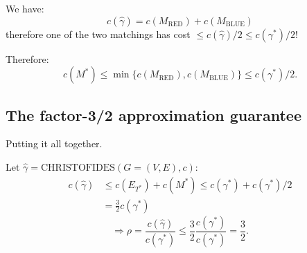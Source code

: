 We have:
\[c(\widehat\gamma)=c(M_{\mathrm{RED}})+c(M_{\mathrm{BLUE}})\]
therefore one of the two matchings has cost $\leq c(\widehat\gamma)/2\leq c(\gamma^*)/2$!

Therefore:
\[c(M^*)\leq\min\{c(M_{\mathrm{RED}}),c(M_{\mathrm{BLUE}})\}\leq c(\gamma^*)/2.\]
\subsection{The factor-3/2 approximation guarantee}
Putting it all together.

Let $\widehat\gamma=\mathrm{CHRISTOFIDES}(G=(V,E),c)$:
\begin{align*}
c(\widehat\gamma)&\leq c(E_{T^*})+c(M^*)\leq c(\gamma^*)+c(\gamma^*)/2\\
&=\frac32c(\gamma^*)
\end{align*}
\[\Rightarrow\rho=\frac{c(\widehat\gamma)}{c(\gamma^*)}\leq\frac32\frac{c(\gamma^*)}{c(\gamma^*)}=\frac32.\]
